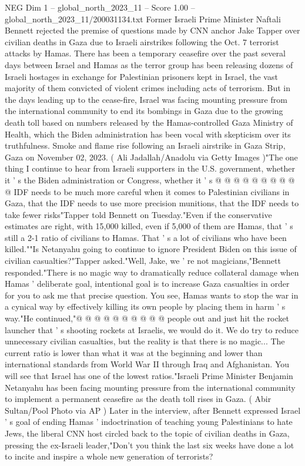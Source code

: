 \begin{textsample}{NEG Dim 1 – global\_north\_2023\_11 – Score 1.00 – global\_north\_2023\_11/200031134.txt}  \label{ex:f1_neg_099}
Former Israeli Prime Minister Naftali Bennett rejected the premise of questions made by CNN anchor Jake Tapper over civilian deaths in Gaza due to Israeli airstrikes following the Oct. 7 terrorist attacks by Hamas.
There has been a temporary ceasefire over the past several days between Israel and Hamas as the terror group has been releasing dozens of Israeli hostages in exchange for Palestinian prisoners kept in Israel, the vast majority of them convicted of violent crimes including acts of terrorism.
But in the days leading up to the cease-fire, Israel was facing mounting pressure from the international community to end its bombings in Gaza due to the growing death toll based on numbers released by the Hamas-controlled Gaza Ministry of Health, which the Biden administration has been vocal with skepticism over its truthfulness.
Smoke and flame rise following an Israeli airstrike in Gaza Strip, Gaza on November 02, 2023. ( Ali Jadallah/Anadolu via Getty Images )"The one thing I continue to hear from Israeli supporters in the U.S. government, whether it ' s the Biden administration or Congress, whether it ' s @ @ @ @ @ @ @ @ @ @ IDF needs to be much more careful when it comes to Palestinian civilians in Gaza, that the IDF needs to use more precision munitions, that the IDF needs to take fewer risks"Tapper told Bennett on Tuesday."Even if the conservative estimates are right, with 15,000 killed, even if 5,000 of them are Hamas, that ' s still a 2-1 ratio of civilians to Hamas.
That ' s a lot of civilians who have been killed.""Is Netanyahu going to continue to ignore President Biden on this issue of civilian casualties?"Tapper asked."Well, Jake, we ' re not magicians,"Bennett responded."There is no magic way to dramatically reduce collateral damage when Hamas ' deliberate goal, intentional goal is to increase Gaza casualties in order for you to ask me that precise question.
You see, Hamas wants to stop the war in a cynical way by effectively killing its own people by placing them in harm ' s way."He continued,"@ @ @ @ @ @ @ @ @ @ people out and just hit the rocket launcher that ' s shooting rockets at Israelis, we would do it.
We do try to reduce unnecessary civilian casualties, but the reality is that there is no magic...
The current ratio is lower than what it was at the beginning and lower than international standards from World War II through Iraq and Afghanistan.
You will see that Israel has one of the lowest ratios."Israeli Prime Minister Benjamin Netanyahu has been facing mounting pressure from the international community to implement a permanent ceasefire as the death toll rises in Gaza. ( Abir Sultan/Pool Photo via AP ) Later in the interview, after Bennett expressed Israel ' s goal of ending Hamas ' indoctrination of teaching young Palestinians to hate Jews, the liberal CNN host circled back to the topic of civilian deaths in Gaza, pressing the ex-Israeli leader,"Don't you think the last six weeks have done a lot to incite and inspire a whole new generation of terrorists?

\end{textsample}
